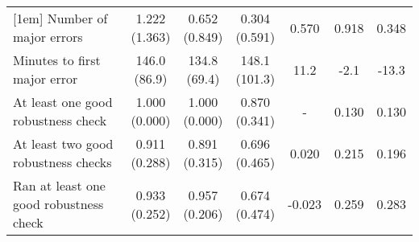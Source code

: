 \begin{table}[ht]
{\begin{tabular}{lcccccc}
[1em]
Number of major errors & \shortstack{1.222\\(1.363)} & \shortstack{0.652\\(0.849)} & \shortstack{0.304\\(0.591)} & \shortstack{0.570\\\relax[0.018]} & \shortstack{0.918\\\relax[\textless0.001]} & \shortstack{0.348\\\relax[0.025]}\\
[1em]
Minutes to first major error & \shortstack{146.0\\(86.9)} & \shortstack{134.8\\(69.4)} & \shortstack{148.1\\(101.3)} & \shortstack{11.2\\\relax[0.626]} & \shortstack{-2.1\\\relax[0.950]} & \shortstack{-13.3\\\relax[0.661]}\\
[1em]
At least one good robustness check & \shortstack{1.000\\(0.000)} & \shortstack{1.000\\(0.000)} & \shortstack{0.870\\(0.341)} & \shortstack{-\\\relax[-]} & \shortstack{0.130\\\relax[0.012]} & \shortstack{0.130\\\relax[0.011]}\\
[1em]
At least two good robustness checks & \shortstack{0.911\\(0.288)} & \shortstack{0.891\\(0.315)} & \shortstack{0.696\\(0.465)} & \shortstack{0.020\\\relax[0.755]} & \shortstack{0.215\\\relax[0.010]} & \shortstack{0.196\\\relax[0.020]}\\
[1em]
Ran at least one good robustness check & \shortstack{0.933\\(0.252)} & \shortstack{0.957\\(0.206)} & \shortstack{0.674\\(0.474)} & \shortstack{-0.023\\\relax[0.632]} & \shortstack{0.259\\\relax[0.002]} & \shortstack{0.283\\\relax[\textless0.001]}\\
[1em]

\end{tabular}}
\end{table}
